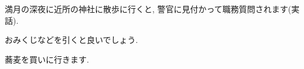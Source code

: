 \showanswerpart
\showanswerchapter
\begin{showanswer}{1.1}
満月の深夜に近所の神社に散歩に行くと, 警官に見付かって職務質問されます(実話).
\end{showanswer}
\begin{showanswer}{1.2}
おみくじなどを引くと良いでしょう.
\end{showanswer}
\showanswerchapter
\begin{showanswer}{2.1}
蕎麦を買いに行きます.
\end{showanswer}

